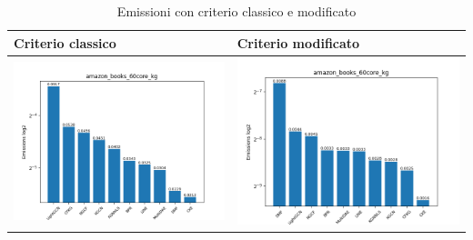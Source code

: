 \begin{table}[H]
    \centering
    \footnotesize
    \setlength\tabcolsep{0pt}
    \begin{tabularx}{\textwidth}{|X|X|}
        \hline
        \textbf{Criterio classico} & \textbf{Criterio modificato} \\
        \hline
        \includegraphics[width=\linewidth, trim=0 0 0 0]{images/emissions_amazon_books_60core_kg_earlyClassic.png} &
        \includegraphics[width=\linewidth, trim=0 0 0 0]{images/emissions_amazon_books_60core_kg_earlyModified.png} \\
        \hline
    \end{tabularx}
    \caption{Emissioni con criterio classico e modificato}
    \label{tab:emissions_info}
\end{table}



